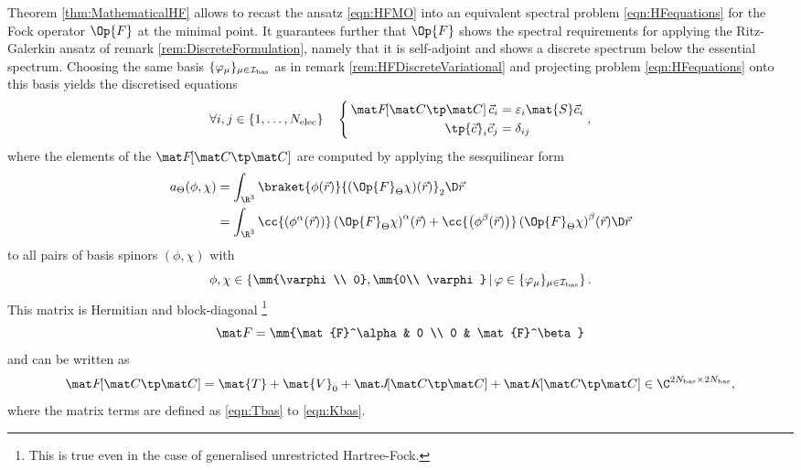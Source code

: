 \begin{rem}
Theorem \vref{thm:MathematicalHF} allows to recast
the \HF ansatz \eqref{eqn:HFMO} into an equivalent
spectral problem \eqref{eqn:HFequations}
for the Fock operator $\Op{F}$ at the minimal point.
It guarantees further that $\Op{F}$
shows the spectral requirements for applying the Ritz-Galerkin ansatz
of remark \vref{rem:DiscreteFormulation},
namely that it is self-adjoint and shows
a discrete spectrum below the essential spectrum.
Choosing the same basis $\{\varphi_\mu\}_{\mu\in\mathcal{I}_\text{bas}}$
as in remark \ref{rem:HFDiscreteVariational}
and projecting problem \eqref{eqn:HFequations} onto this basis
yields the discretised \HF equations
\begin{equation}
	\forall i,j \in \{1,\ldots,\Nelec\} \quad
	\left\{
	\begin{aligned}
	\, \matFfull \vec{c}_i &= \varepsilon_i \mat{S} \vec{c}_i \\
	   \tp{\vec{c}}_i \vec{c}_j &= \delta_{ij}
	\end{aligned}
	\right. ,
	\label{eqn:HFDiscreteEquations}
\end{equation}
where the elements of the  $\matFfull$
are computed by applying the sesquilinear form
\begin{equation}
	\begin{aligned}
	a_\Theta(\phi,\chi)
		&= \int_{\R^3} \braket{\phi(\vec{r})}{ \left(\Op{F}_\Theta \chi\right)\!(\vec{r})}_2
			\D \vec{r} \\
		&= \int_{\R^3}
			\cc{\left(\phi^\alpha(\vec{r})\right)}
				\left(\Op{F}_\Theta\chi\right)^\alpha\!(\vec{r})
			+ \cc{\left(\phi^\beta(\vec{r})\right)}
				\left(\Op{F}_\Theta\chi\right)^\beta\!(\vec{r}) \D \vec{r}
	\end{aligned}
	\label{eqn:SesquilinearFormFock}
\end{equation}
to all pairs of basis spinors $(\phi, \chi)$ with
\[ \phi, \chi \in \left\{ \mm{\varphi\\ 0}, \mm{0\\ \varphi} \,\middle|\,
	\varphi \in \{\varphi_\mu\}_{\mu\in\Ibas} \right\}.
\]
This matrix is Hermitian and block-diagonal%
\footnote{This is true even in the case of generalised unrestricted Hartree-Fock.}
\[ \matF = \mm{\mat{F}^\alpha & 0 \\ 0 & \mat{F}^\beta} \]
and can be written as
\begin{equation}
	\matFfull = \mat{T} + \mat{V}_0 + \matJfull + \matKfull \in \C^{2\Nbas\times 2\Nbas},
	\label{eqn:FockMatrix}
\end{equation}
where the matrix terms are defined as \eqref{eqn:Tbas} to \eqref{eqn:Kbas}.


\end{rem}

